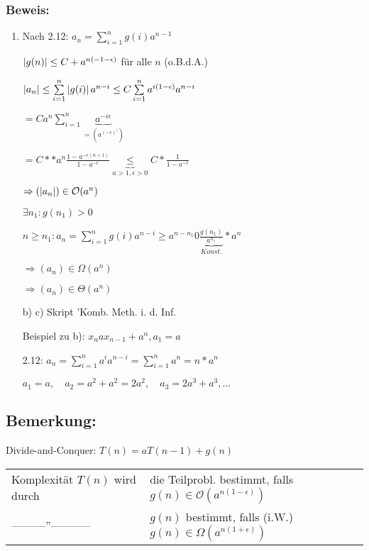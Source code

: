 \subsubsection*{Beweis:}
\begin{enumerate}
	\item Nach 2.12: $ a_n= \sum_{i=1}^{n}g(i)a^{n-1}$
	
	$\left|g(n)\right|\leq C+ a^{n(-1-\epsilon)}$ für alle $n$ (o.B.d.A.)
	
	$\abs{a_n}\leq \sum_{i=1}^{n}\abs{g(i)}a^{n-i}\leq C \sum_{i=1}^{n}a^{i(1-\epsilon)}a^{n-i}$
	
	$ = C a^n \sum_{i=1}^{n}\underbrace{a^{-i\epsilon}}_{=(a^{(-\epsilon)^i})}$

	$= C**a^n\frac{1-a^{-\epsilon(n+1)}}{1-a^{-\epsilon}} \underbrace{\leq}_{a>1,\epsilon>0} C*\frac{1}{1-a^{-\epsilon}}$

	$ \Rightarrow (\left|a_n\right|)\in \mathcal{O}(a^n)$
	
	$\exists n_1: g(n_1)>0$
	
	$n\geq n_1: a_n= \sum_{i=1}^{n}g(i)a^{n-i} \geq a^{n-n_1} 0 \underbrace{\frac{g(n_1)}{a^{n_1}}}_{Konst.}*a^n$
	
	$\Rightarrow (a_n) \in \Omega(a^n)$
	
	$\Rightarrow (a_n)\in \Theta(a^n)$
	
	\item[b) c)] Skript 'Komb. Meth. i. d. Inf.
	
	\item[Beispiel zu b):] $x_nax_{n-1} + a^n, a_1=a$
	
	2.12: $ a_n = \sum_{i=1}^{n}a^ia^{n-i}=\sum_{i=1}^{n}a^n=n*a^n$
	
	$a_1 = a, \quad a_2 = a^2+a^2 = 2a^2, \quad a_3 = 2a^3+a^3,...$
	
\end{enumerate}

\subsection{Bemerkung:}%
Divide-and-Conquer: $ T(n) = aT(n-1)+g(n)$

\begin{tabular}{l l}
	Komplexität $T(n)$ wird durch 	& die Teilprobl. bestimmt, falls $g(n) \in \mathcal{O}(a^{n(1-\epsilon)})$\\
	---------''-----------			& $g(n)$ bestimmt, falls (i.W.) $g(n) \in \Omega (a^{n(1+\epsilon)})$
\end{tabular}

